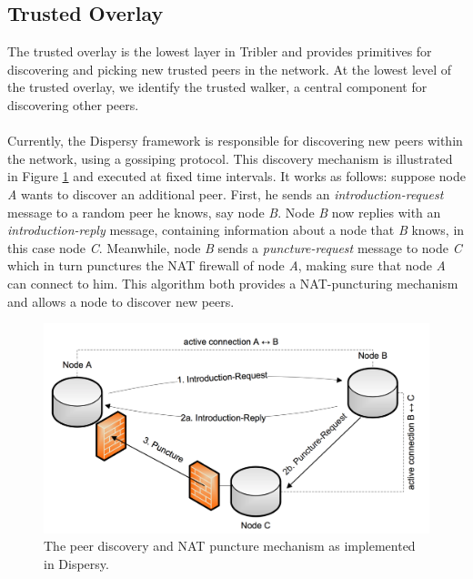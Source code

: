 \subsection{Trusted Overlay}
The trusted overlay is the lowest layer in Tribler and provides primitives for discovering and picking new trusted peers in the network. At the lowest level of the trusted overlay, we identify the trusted walker, a central component for discovering other peers.\\\\
Currently, the Dispersy framework is responsible for discovering new peers within the network, using a gossiping protocol\cite{zeilemaker2013dispersy}. This discovery mechanism is illustrated in Figure \ref{fig:dispersy-discover} and executed at fixed time intervals. It works as follows: suppose node \emph{A} wants to discover an additional peer. First, he sends an \emph{introduction-request} message to a random peer he knows, say node \emph{B}. Node \emph{B} now replies with an \emph{introduction-reply} message, containing information about a node that \emph{B} knows, in this case node \emph{C}. Meanwhile, node \emph{B} sends a \emph{puncture-request} message to node \emph{C} which in turn punctures the NAT firewall of node \emph{A}, making sure that node \emph{A} can connect to him. This algorithm both provides a NAT-puncturing mechanism and allows a node to discover new peers.\\

\begin{figure}[h!]
	\centering
	\includegraphics[width=0.7\columnwidth]{images/architecture/dispersy_discover}
	\caption{The peer discovery and NAT puncture mechanism as implemented in Dispersy.}
	\label{fig:dispersy-discover}
\end{figure}

